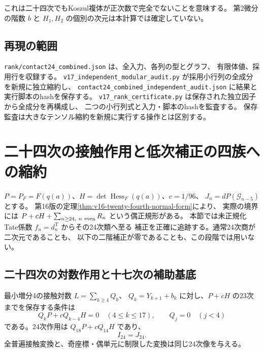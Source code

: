 これは二十四次でもKoszul複体が正次数で完全でないことを意味する。
第2微分の階数 $b$ と $H_1,H_2$ の個別の次元は本計算では確定していない。

\subsection{再現の範囲}

\texttt{rank/contact24\_combined.json} は、全入力、各列の型とグラフ、
有限体値、採用行を収録する。
\texttt{v17\_independent\_modular\_audit.py} が採用小行列の全成分を新規に独立縮約し、
\texttt{contact24\_combined\_independent\_audit.json} に結果と実行脚本のhashを保存する。
\texttt{v17\_rank\_certificate.py} は保存された独立因子から全成分を再構成し、
二つの小行列式と入力・脚本のhashを監査する。
保存監査は大きなテンソル縮約を新規に実行する操作とは区別する。




\section{二十四次の接触作用と低次補正の四族への縮約}
\label{sec:v17-contact-twenty-fourth}

$P=P_F=F(q(a))$、$H=\det\operatorname{Hess}_F(q(a))$、$c=1/96$、
$J_n=dP(\mathcal G_{n-5})$ とする。
第16版の定理\ref{thm:v16-twenty-fourth-normal-form}により、
実際の境界には $P+cH+\sum_{n\ge24,\ n\ {\rm even}}R_n$ という偶正規形がある。
本節では未正規化Tate係数 $f_n=d_n^{\mathrm T}$ からその24次類へ至る
補正を正確に追跡する。通常24次商が二次元であることも、
以下の二階補正が零であることも、この段階では用いない。

\subsection{二十四次の対数作用と十七次の補助基底}

\begin{proposition}[二十四次の保存条件と有効像]
\label{prop:v17-effective-twenty-fourth}
最小増分4の接触対数 $L=\sum_{k\ge4}Q_k$、
$Q_k=Y_{k+1}+b_k$ に対し、$P+cH$ の23次までを保存する条件は
\begin{equation}\label{eq:v17-twenty-fourth-preservation}
 Q_kP+cQ_{k-4}H=0\quad(4\le k\le17),\qquad Q_j=0\quad(j<4)
\end{equation}
である。24次作用は $Q_{18}P+cQ_{14}H$ であり、
\[
                            I_{24}=J_{24}.
\]
全普遍接触変換と、奇座標・偶単元に制限した変換は同じ24次像を与える。
\end{proposition}

